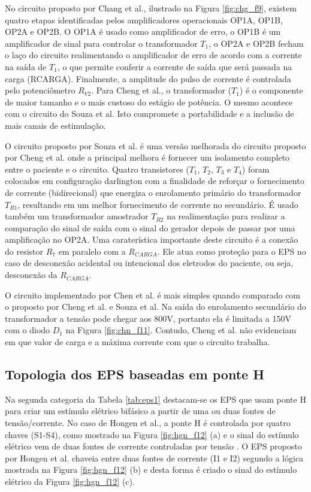 No circuito proposto por Chang et al., ilustrado na Figura \ref{fig:chg_f9}, existem quatro etapas identificadas pelos amplificadores operacionais OP1A, OP1B, OP2A e OP2B. O OP1A é usado como amplificador de erro, o OP1B é um amplificador de sinal para controlar o transformador $T_{1}$, o OP2A e OP2B fecham o laço do circuito realimentando o amplificador de erro de acordo com a corrente na saída de $T_{1}$, o que permite conferir a corrente de saída que será passada na carga (RCARGA). Finalmente, a amplitude do pulso de corrente é controlada pelo potenciômetro $R_{V2}$. Para Cheng et al., o transformador ($T_{1}$) é o componente de maior tamanho e o mais custoso do estágio de potência. O mesmo acontece com o circuito do Souza et al. Isto compromete a portabilidade e a inclusão de mais canais de estimulação.

O circuito proposto por Souza et al. é uma versão melhorada do circuito proposto por Cheng et al. onde a principal melhora é fornecer um isolamento completo entre o paciente e o circuito. Quatro transistores ($T_{1}$, $T_{2}$, $T_{3}$ e $T_{4}$) foram colocados em configuração darlington com a finalidade de reforçar o fornecimento de corrente (bidirecional) que energiza o enrolamento primário do transformador $T_{R1}$, resultando em um melhor fornecimento de corrente no secundário. É usado também um transformador amostrador $T_{R2}$ na realimentação para realizar a comparação do sinal de saída com o sinal do gerador depois de passar por uma amplificação no OP2A. Uma caraterística importante deste circuito é a conexão do resistor $R_{7}$ em paralelo com a $R_{CARGA}$. Ele atua como proteção para o \acrshort{EPS} no caso de desconexão acidental ou intencional dos eletrodos do paciente, ou seja, desconexão da $R_{CARGA}$.

O circuito implementado por Chen et al. é mais simples quando comparado com o proposto por Cheng et al. e Souza et al. Na saída do enrolamento secundário do transformador a tensão pode chegar aos 800V, portanto ela é limitada a 150V com o diodo $D_{1}$ na Figura \ref{fig:chn_f11}. Contudo, Cheng et al. não evidenciam em que valor de carga e a máxima corrente com que o circuito trabalha.

\subsection*{Topologia dos \acrshort{EPS} baseadas em ponte H}

Na segunda categoria da Tabela \ref{tab:eps1} destacam-se os \acrshort{EPS} que usam ponte H para criar um estímulo elétrico bifásico a partir de uma ou duas fontes de tensão/corrente.
No caso de Hongen et al., a ponte H é controlada por quatro chaves (S1-S4), como mostrado na Figura \ref{fig:hgn_f12} (a) e o sinal do estímulo elétrico vem de duas fontes de corrente controladas por tensão \cite{Hongen2011}. O EPS proposto por Hongen et al. chaveia entre duas fontes de corrente (I1 e I2) segundo a lógica mostrada na Figura \ref{fig:hgn_f12} (b) e desta forma é criado o sinal do estímulo elétrico da Figura \ref{fig:hgn_f12} (c).

